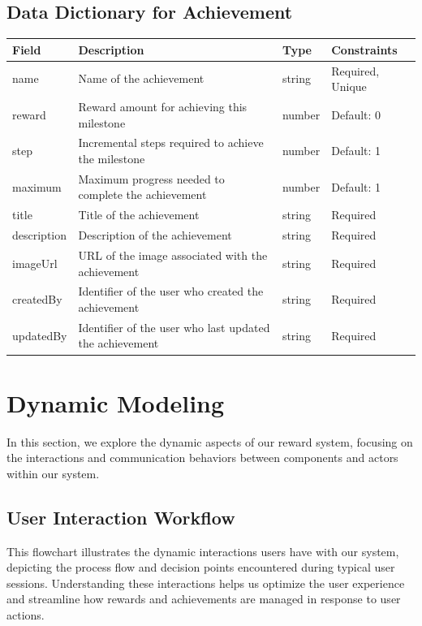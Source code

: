 \subsection{Data Dictionary for Achievement}
\begin{tabular}{|l|l|l|l|}
\hline
\textbf{Field} & \textbf{Description} & \textbf{Type} & \textbf{Constraints} \\
\hline
name & Name of the achievement & string & Required, Unique \\
\hline
reward & Reward amount for achieving this milestone & number & Default: 0 \\
\hline
step & Incremental steps required to achieve the milestone & number & Default: 1 \\
\hline
maximum & Maximum progress needed to complete the achievement & number & Default: 1 \\
\hline
title & Title of the achievement & string & Required \\
\hline
description & Description of the achievement & string & Required \\
\hline
imageUrl & URL of the image associated with the achievement & string & Required \\
\hline
createdBy & Identifier of the user who created the achievement & string & Required \\
\hline
updatedBy & Identifier of the user who last updated the achievement & string & Required \\
\hline
\end{tabular}

\section{Dynamic Modeling}
In this section, we explore the dynamic aspects of our reward system, focusing on the interactions and communication behaviors between components and actors within our system. 

\subsection{User Interaction Workflow}
This flowchart illustrates the dynamic interactions users have with our system, depicting the process flow and decision points encountered during typical user sessions. Understanding these interactions helps us optimize the user experience and streamline how rewards and achievements are managed in response to user actions.

